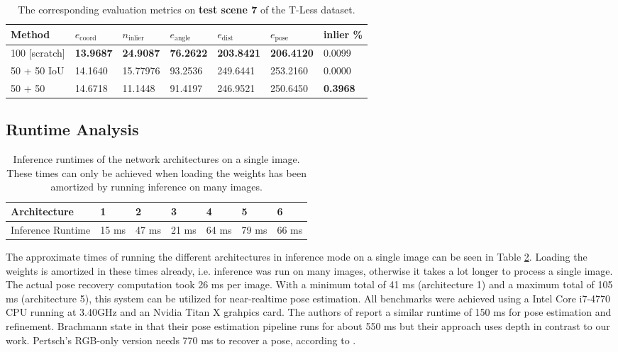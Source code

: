 \begin{table}[t]
\centering
\begin{tabular}{|l||llllll|} \hline
Method            & $e_{\text{coord}}$ & $n_{\text{inlier}}$ & $e_{\text{angle}}$ & $e_{\text{dist}}$ & $e_{\text{pose}}$ & inlier \% \\ \hline \hline \rowcolor{Gray}
100 {[}scratch{]} & \textbf{13.9687}            & \textbf{24.9087}                  & \textbf{76.2622}            & \textbf{203.8421}            & \textbf{206.4120}           & 0.0099    \\ \hline
50 + 50 IoU       & 14.1640            & 15.77976                   & 93.2536            & 249.6441          & 253.2160          & 0.0000       \\ \hline \rowcolor{Gray}
50 + 50           & 14.6718            & 11.1448                   & 91.4197            & 246.9521          & 250.6450          &   \textbf{0.3968}  \\ \hline
\end{tabular}
\caption{The corresponding evaluation metrics on \textbf{test scene 7} of the T-Less dataset.}
\label{table:active_learning_test}
\end{table}

\subsection{Runtime Analysis}

\begin{table}[b]
\centering
\begin{tabular}{|l||llllll|}
\hline
Architecture      & 1     & 2     & 3     & 4     & 5     & 6     \\ \hline \hline \rowcolor{Gray}
Inference Runtime & 15 ms & 47 ms & 21 ms & 64 ms & 79 ms & 66 ms \\  \hline  
\end{tabular}
\caption{Inference runtimes of the network architectures on a single image. These times can only be achieved when loading the weights has been amortized by running inference on many images.}
\label{table:network_runtimes}
\end{table}

The approximate times of running the different architectures in inference mode on a single image can be seen in Table \ref{table:network_runtimes}. Loading the weights is amortized in these times already, i.e. inference was run on many images, otherwise it takes a lot longer to process a single image. The actual pose recovery computation took 26 ms per image. With a minimum total of 41 ms (architecture 1) and a maximum total of 105 ms (architecture 5), this system can be utilized for near-realtime pose estimation. All benchmarks were achieved using a Intel Core i7-4770 CPU running at 3.40GHz and an Nvidia Titan X grahpics card. The authors of \cite{bb8} report a similar runtime of 150 ms for pose estimation and refinement. Brachmann \etal state in \cite{brachmann1} that their pose estimation pipeline runs for about 550 ms but their approach uses depth in contrast to our work. Pertsch's RGB-only version needs 770 ms to recover a pose, according to \cite{pertsch}.